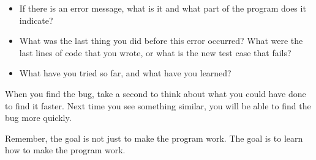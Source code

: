 \documentclass[10pt]{book}
\begin{document}
\begin{itemize}

\item If there is an error message, what is it
and what part of the program does it indicate?

\item What was the last thing you did before this error occurred?
What were the last lines of code that you wrote, or what is
the new test case that fails?

\item What have you tried so far, and what have you learned?

\end{itemize}

When you find the bug, take a second to think about what you
could have done to find it faster.  Next time you see something
similar, you will be able to find the bug more quickly.

Remember, the goal is not just to make the program
work.  The goal is to learn how to make the program work.



\printindex

\clearemptydoublepage
\end{document}
